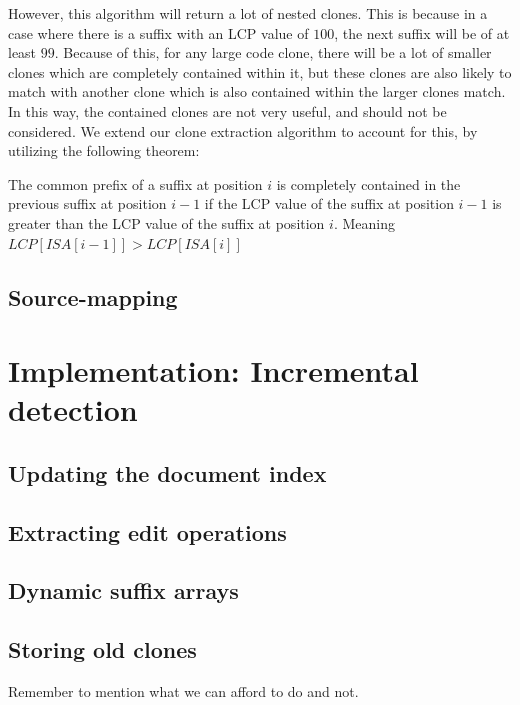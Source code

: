 However, this algorithm will return a lot of nested clones. This is because in a case
where there is a suffix with an LCP value of $100$, the next suffix will be of at least
$99$. Because of this, for any large code clone, there will be a lot of smaller clones
which are completely contained within it, but these clones are also likely to match with
another clone which is also contained within the larger clones match. In this way, the
contained clones are not very useful, and should not be considered. We extend our clone
extraction algorithm to account for this, by utilizing the following theorem:

\begin{theorem} The common prefix of a suffix at position $i$ is completely contained in
    the previous suffix at position $i - 1$ if the LCP value of the suffix at position $i
    - 1$ is greater than the LCP value of the suffix at position $i$. Meaning $LCP[ISA[i -
    1]] > LCP[ISA[i]]$
    
\end{theorem}


\section{Source-mapping}

\chapter{Implementation: Incremental detection}

\section{Updating the document index}

\section{Extracting edit operations}

\section{Dynamic suffix arrays}

\section{Storing old clones}


Remember to mention what we can afford to do and not.
